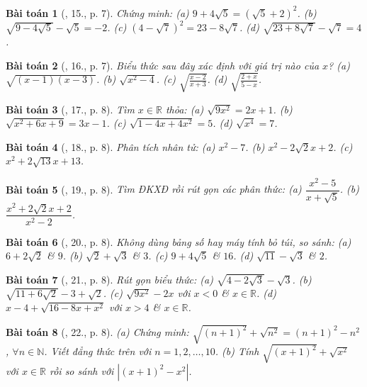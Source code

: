\documentclass{article}
\newtheorem{baitoan}{Bài toán}
\begin{document}
\begin{baitoan}[\cite{SBT_Toan_9_tap_1}, 15., p. 7]
	Chứng minh: (a) $9 + 4\sqrt{5} = (\sqrt{5} + 2)^2$. (b) $\sqrt{9 - 4\sqrt{5}} - \sqrt{5} = -2$. (c) $(4 - \sqrt{7})^2 = 23 - 8\sqrt{7}$. (d) $\sqrt{23 + 8\sqrt{7}} - \sqrt{7} = 4$.
\end{baitoan}

\begin{baitoan}[\cite{SBT_Toan_9_tap_1}, 16., p. 7]
	Biểu thức sau đây xác định với giá trị nào của $x$? (a) $\sqrt{(x - 1)(x - 3)}$. (b) $\sqrt{x^2 - 4}$. (c) $\sqrt{\frac{x - 2}{x + 3}}$. (d) $\sqrt{\frac{2 + x}{5 - x}}$.
\end{baitoan}

\begin{baitoan}[\cite{SBT_Toan_9_tap_1}, 17., p. 8]
	Tìm $x\in\mathbb{R}$ thỏa: (a) $\sqrt{9x^2} = 2x + 1$. (b) $\sqrt{x^2 + 6x + 9} = 3x - 1$. (c) $\sqrt{1 - 4x + 4x^2} = 5$. (d) $\sqrt{x^4} = 7$.
\end{baitoan}

\begin{baitoan}[\cite{SBT_Toan_9_tap_1}, 18., p. 8]
	Phân tích nhân tử: (a) $x^2 - 7$. (b) $x^2  - 2\sqrt{2}x + 2$. (c) $x^2 + 2\sqrt{13}x + 13$.
\end{baitoan}

\begin{baitoan}[\cite{SBT_Toan_9_tap_1}, 19., p. 8]
	Tìm ĐKXĐ rồi rút gọn các phân thức: (a) $\dfrac{x^2 - 5}{x + \sqrt{5}}$. (b) $\dfrac{x^2 + 2\sqrt{2}x + 2}{x^2 - 2}$.
\end{baitoan}

\begin{baitoan}[\cite{SBT_Toan_9_tap_1}, 20., p. 8]
	Không dùng bảng số hay máy tính bỏ túi, so sánh: (a) $6 + 2\sqrt{2}$ \& $9$. (b) $\sqrt{2} + \sqrt{3}$ \& $3$. (c) $9 + 4\sqrt{5}$ \& $16$. (d) $\sqrt{11} - \sqrt{3}$ \& $2$.
\end{baitoan}

\begin{baitoan}[\cite{SBT_Toan_9_tap_1}, 21., p. 8]
	Rút gọn biểu thức: (a) $\sqrt{4 - 2\sqrt{3}} - \sqrt{3}$. (b) $\sqrt{11 + 6\sqrt{2}} - 3 + \sqrt{2}$. (c) $\sqrt{9x^2} - 2x$ với $x < 0$ \& $x\in\mathbb{R}$. (d) $x - 4 + \sqrt{16 - 8x + x^2}$ với $x > 4$ \& $x\in\mathbb{R}$.
\end{baitoan}

\begin{baitoan}[\cite{SBT_Toan_9_tap_1}, 22., p. 8]
	(a) Chứng minh: $\sqrt{(n + 1)^2} + \sqrt{n^2} = (n + 1)^2 - n^2$, $\forall n\in\mathbb{N}$. Viết đẳng thức trên với $n = 1,2,\ldots,10$. (b) Tính $\sqrt{(x + 1)^2} + \sqrt{x^2}$ với $x\in\mathbb{R}$ rồi so sánh với $|(x + 1)^2 - x^2|$.
\end{baitoan}
\end{document}
